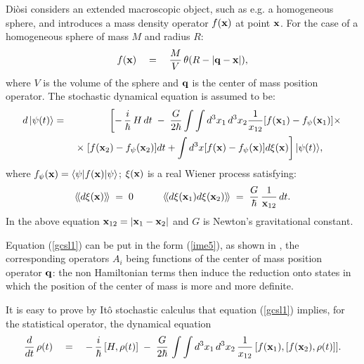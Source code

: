 \documentclass[12pt]{article}
\newcommand{\llangle}{\langle\!\langle}
\newcommand{\rrangle}{\rangle\!\rangle}
\begin{document}
Di\`osi considers an extended macroscopic object, such as e.g. a
homogeneous sphere, and introduces a mass density operator $f({\bf
x})$ at point ${\bf x}$. For the case of a homogeneous sphere of
mass $M$ and radius $R$:
\begin{equation} \label{jdt}
f({\bf x}) \quad = \quad \frac{M}{V}\, \theta(R - |{\bf q} - {\bf
x}|),
\end{equation}
where $V$ is the volume of the sphere and ${\bf q}$ is the center
of mass position operator. The stochastic dynamical equation is
assumed to be:
\begin{eqnarray} \label{gcsl1}
d\,|\psi(t)\rangle & = & \left[ -\,\frac{i}{\hbar}\,H\, dt \; - \;
\frac{G}{2\hbar} \int\int d^{3} x_{1}\, d^{3} x_{2}
\frac{1}{x_{12}} [f({\bf x}_{1}) - f_{\psi}({\bf x}_{1})] \times
\right. \nonumber \\
& & \; \times\left. [f({\bf x}_{2}) - f_{\psi}({\bf x}_{2})] dt  +
\int d^{3} x [f({\bf x}) - f_{\psi}({\bf x})] d\xi ({\bf x})
\right] |\psi(t)\rangle, \qquad
\end{eqnarray}
where $f_{\psi}({\bf x}) = \langle\psi|f({\bf x})| \psi\rangle$;
$\xi({\bf x})$ is a real Wiener process satisfying:
\begin{equation}
\llangle d\xi({\bf x}) \rrangle \; = \; 0 \qquad \quad \llangle
d\xi({\bf x}_{1}) d\xi({\bf x}_{2}) \rrangle \; = \;
\frac{G}{\hbar}\, \frac{1}{{\bf x}_{12}}\, dt.
\end{equation}
In the above equation ${\bf x}_{12} = |{\bf x}_{1} - {\bf x}_{2}|$
and $G$ is Newton's gravitational constant.

Equation (\ref{gcsl1}) can be put in the form (\ref{ime5}), as
shown in \cite{ggrg}, the corresponding operators $A_{i}$ being
functions of the center of mass position operator ${\bf q}$: the
non Hamiltonian terms then induce the reduction onto states in
which the position of the center of mass is more and more
definite.

It is easy to prove by It\^o stochastic calculus that equation
(\ref{gcsl1}) implies, for the statistical operator, the dynamical
equation
\begin{equation} \label{gcsl2}
\frac{d}{dt}\, \rho(t) \quad = \quad -\, \frac{i}{\hbar}\, [H,
\rho(t)] \; - \; \frac{G}{2\hbar}\, \int\int d^{3} x_{1}\, d^{3}
x_{2}\, \frac{1}{x_{12}}\, [f({\bf x}_{1}), [ f({\bf x}_{2}),
\rho(t)]].
\end{equation}
\end{document}
